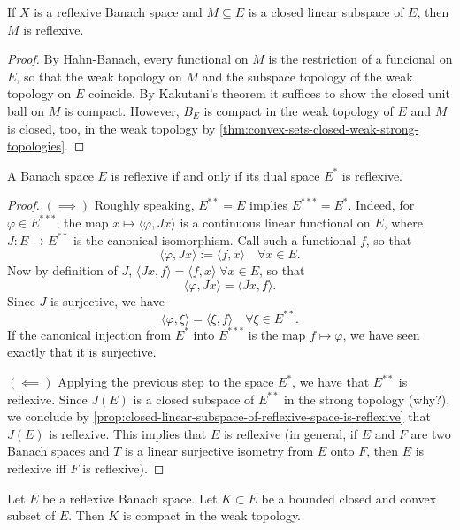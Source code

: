 \documentclass{article}
\theoremstyle{definition}
\numberwithin{equation}{section}
\begin{document}
	\begin{prop}\label{prop:closed-linear-subspace-of-reflexive-space-is-reflexive}
		If $X$ is a reflexive Banach space and $M\subseteq E$ is a closed linear subspace of $E$, then $M$ is reflexive.
	\end{prop}
	\begin{proof}
		By Hahn-Banach, every functional on $M$ is the restriction of a funcional on $E$, so that the weak topology on $M$ and the subspace topology of the weak topology on $E$ coincide. By Kakutani's theorem it suffices to show the closed unit ball on $M$ is compact. However, $B_E$ is compact in the weak topology of $E$ and $M$ is closed, too, in the weak topology by \cref{thm:convex-sets-closed-weak-strong-topologies}.
	\end{proof}
	\begin{coro}\label{coro:space-reflexive-iff-dual-reflexive}
		A Banach space $E$ is reflexive if and only if its dual space $E^*$ is reflexive.
	\end{coro}
	\begin{proof}\leavevmode
		$(\implies)$ Roughly speaking, $E^{**}=E$ implies $E^{***}=E^*$. Indeed, for $\varphi\in E^{***}$, the map $x\mapsto\langle\varphi,Jx\rangle$ is a continuous linear functional on $E$, where $J:E\to E^{**}$ is the canonical isomorphism. Call such a functional $f$, so that
		\[\langle \varphi,Jx\rangle:=\langle f,x\rangle\quad\forall x\in E.\]
		Now by definition of $J$, $\langle Jx,f\rangle=\langle f,x\rangle\;\forall x\in E$, so that
		\[\langle\varphi , Jx\rangle=\langle Jx,f\rangle.\]
		Since $J$ is surjective, we have
		\[\langle \varphi,\xi\rangle=\langle \xi,f\rangle\quad\forall \xi\in E^{**}.\]
		If the canonical injection from $E^{*}$ into $E^{***}$ is the map $f\mapsto\varphi$, {\color{orange} we have seen exactly that it is surjective}.
		
		$(\impliedby)$ Applying the previous step to the space $E^*$, we have that $E^{**}$ is reflexive. Since $J(E)$ is a closed subspace of $E^{**}$ in the strong topology (why?), we conclude by \cref{prop:closed-linear-subspace-of-reflexive-space-is-reflexive} that $J(E)$ is reflexive. This implies that $E$ is reflexive (in general, if $E$ and $F$ are two Banach spaces and $T$ is a linear surjective isometry from $E$ onto $F$, then $E$ is reflexive iff $F$ is reflexive).	
	\end{proof}
	\begin{coro}
		Let $E$ be a reflexive Banach space. Let $K\subset E$ be a bounded closed and convex subset of $E$. Then $K$ is compact in the weak topology.
	\end{coro}
\end{document}
